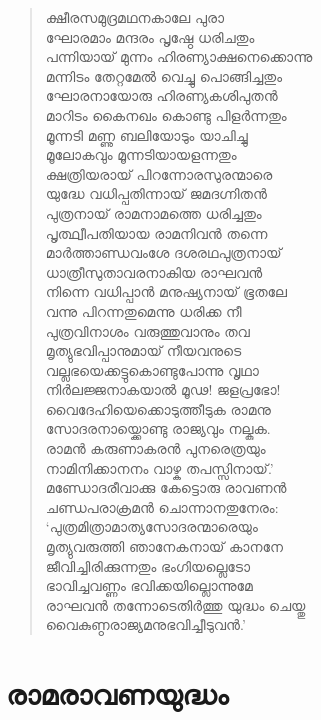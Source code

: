 \begin{verse}
ക്ഷീരസമുദ്രമഥനകാലേ പുരാ\\
ഘോരമാം മന്ദരം പൃഷ്ഠേ ധരിചതും\\
പന്നിയായ് മുന്നം ഹിരണ്യാക്ഷനെക്കൊന്നു\\
മന്നിടം തേറ്റമേല്‍ വെച്ചു പൊങ്ങിച്ചതും\\
ഘോരനായോരു ഹിരണ്യകശിപുതന്‍\\
മാറിടം കൈനഖം കൊണ്ടു പിളര്‍ന്നതും\\
മൂന്നടി മണ്ണു ബലിയോടും യാചിച്ചു\\
മൂലോകവും മൂന്നടിയായളന്നതും\\
ക്ഷത്രിയരായ് പിറന്നോരസുരന്മാരെ\\
യുദ്ധേ വധിപ്പതിന്നായ് ജമദഗ്നിതന്‍\\
പുത്രനായ് രാമനാമത്തെ ധരിച്ചതും\\
പൃത്ഥ്വീപതിയായ രാമനിവന്‍ തന്നെ\\
മാര്‍ത്താണ്ഡവംശേ ദശരഥപുത്രനായ്\\
ധാത്രീസുതാവരനാകിയ രാഘവന്‍\\
നിന്നെ വധിപ്പാന്‍ മനുഷ്യനായ് ഭൂതലേ\\
വന്നു പിറന്നതുമെന്നു ധരിക്ക നീ\\
പുത്രവിനാശം വരുത്തുവാനും തവ\\
മൃത്യുഭവിപ്പാനുമായ് നീയവനുടെ\\
വല്ലഭയെക്കട്ടുകൊണ്ടുപോന്നു വൃഥാ\\
നിര്‍ലജ്ജനാകയാല്‍ മൂഢ! ജളപ്രഭോ!\\
വൈദേഹിയെക്കൊടുത്തീടുക രാമനു\\
സോദരനായ്ക്കൊണ്ടു രാജ്യവും നല്കുക.\\
രാമന്‍ കരുണാകരന്‍ പുനരെത്രയും\\
നാമിനിക്കാനനം വാഴ്ക തപസ്സിനായ്.’\\
മണ്ഡോദരീവാക്കു കേട്ടൊരു രാവണന്‍\\
ചണ്ഡപരാക്രമന്‍ ചൊന്നാനതുനേരം:\\
‘പുത്രമിത്രാമാത്യസോദരന്മാരെയും\\
മൃത്യുവരുത്തി ഞാനേകനായ് കാനനേ\\
ജീവിച്ചിരിക്കുന്നതും ഭംഗിയല്ലെടോ\\
ഭാവിച്ചവണ്ണം ഭവിക്കയില്ലൊന്നുമേ\\
രാഘവന്‍ തന്നോടെതിര്‍ത്തു യുദ്ധം ചെയ്തു\\
വൈകുണ്ഠരാജ്യമനുഭവിച്ചീടുവന്‍.’
\end{verse}


\section{രാമരാവണയുദ്ധം}


